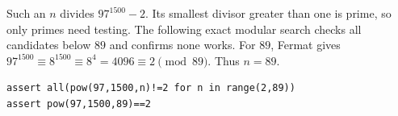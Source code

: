 Such an $n$ divides $97^{1500}-2$. Its smallest divisor greater than one is prime, so only primes need testing. The following exact modular search checks all candidates below $89$ and confirms none works. For $89$, Fermat gives $97^{1500}\equiv8^{1500}\equiv8^4=4096\equiv2\pmod{89}$. Thus $\boxed{n=89}$.\begin{verbatim}
assert all(pow(97,1500,n)!=2 for n in range(2,89))
assert pow(97,1500,89)==2
\end{verbatim}
